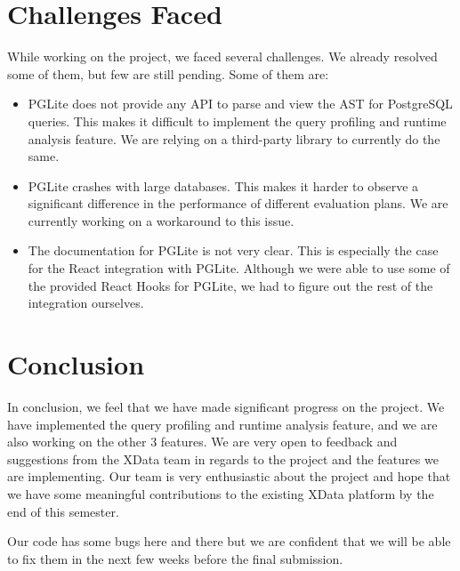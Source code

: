\documentclass{article}
\begin{document}
\section{Challenges Faced}
While working on the project, we faced several challenges. We already resolved some of them, but few are still pending. Some of them are:
\begin{itemize}
    \item PGLite does not provide any API to parse and view the AST for PostgreSQL queries. This makes it difficult to implement the query profiling and runtime analysis feature. We are relying on a third-party library to currently do the same.
    \item PGLite crashes with large databases. This makes it harder to observe a significant difference in the performance of different evaluation plans. We are currently working on a workaround to this issue.
    \item The documentation for PGLite is not very clear. This is especially the case for the React integration with PGLite. Although we were able to use some of the provided React Hooks for PGLite, we had to figure out the rest of the integration ourselves. 
\end{itemize}

\section{Conclusion}

In conclusion, we feel that we have made significant progress on the project. We have implemented the query profiling and runtime analysis feature, and we are also working on the other 3 features. We are very open to feedback and suggestions from the XData team in regards to the project and the features we are implementing. Our team is very enthusiastic about the project and hope that we have some meaningful contributions to the existing XData platform by the end of this semester.

\medskip

Our code has some bugs here and there but we are confident that we will be able to fix them in the next few weeks before the final submission.

    
\end{document}
